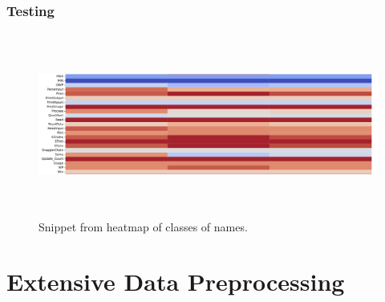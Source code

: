 \documentclass[10pt,english,a4paper]{report}
\begin{document}




\subsubsection{Testing}

\begin{figure}[h!]
    \centering
    \includegraphics[width=16cm, height=6cm]{figures/heatmap_snippet.png} 
    \caption{Snippet from heatmap of classes of names.}
    \label{fig:func_lengths_distr_merged}
\end{figure}



\section{Extensive Data Preprocessing}






\end{document}
